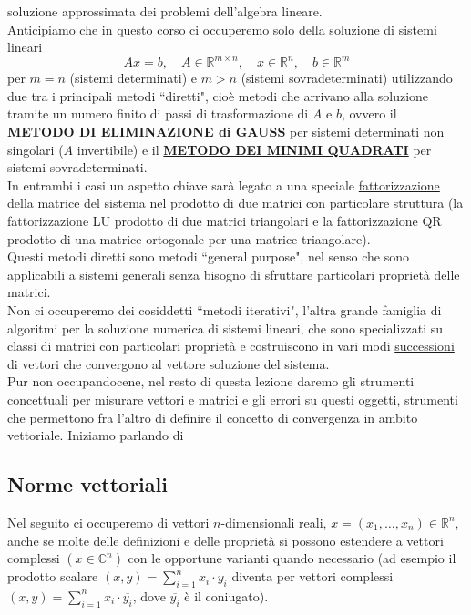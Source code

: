 \documentclass[12pt,a4paper]{article}
\begin{document}
soluzione approssimata dei problemi dell'algebra lineare.\\
Anticipiamo che in questo corso ci occuperemo solo della soluzione di sistemi lineari
\begin{equation*}
    Ax=b,\quad A\in\mathbb{R}^{m\times n}, \quad x\in\mathbb{R}^n,\quad b\in\mathbb{R}^m
\end{equation*}
per $m=n$ (sistemi determinati) e $m>n$ (sistemi sovradeterminati) utilizzando due tra i principali metodi ``diretti", cioè metodi che arrivano alla soluzione tramite un numero finito di passi di trasformazione di $A$ e $b$, ovvero il \uline{\textbf{METODO DI ELIMINAZIONE di GAUSS}} per sistemi determinati
non singolari ($A$ invertibile) e il \uline{\textbf{METODO DEI MINIMI QUADRATI}} per sistemi sovradeterminati.\\In entrambi i casi un aspetto chiave sarà legato a una speciale \uline{fattorizzazione} della matrice del sistema nel prodotto di due matrici con particolare struttura (la fattorizzazione LU prodotto di due matrici triangolari e la fattorizzazione QR prodotto di una matrice ortogonale per una matrice triangolare).\\Questi metodi diretti sono metodi
``general purpose", nel senso che sono applicabili a sistemi generali senza bisogno di sfruttare particolari proprietà delle matrici.\\Non ci occuperemo dei cosiddetti ``metodi iterativi", l'altra grande famiglia di algoritmi per la soluzione numerica di sistemi lineari, che sono specializzati su classi di matrici con particolari proprietà e costruiscono in vari modi \uline{successioni} di vettori che convergono al vettore soluzione del sistema.\\Pur non occupandocene, nel
resto di questa lezione daremo gli strumenti concettuali per misurare vettori e matrici e gli errori su questi oggetti, strumenti che permettono fra l'altro di definire il concetto di convergenza in ambito vettoriale. Iniziamo parlando di

\subsection{Norme vettoriali}
Nel seguito ci occuperemo di vettori $n$-dimensionali reali, $x = (x_1, \dotso, x_n) \in \mathbb{R}^n$, anche se molte delle definizioni e delle proprietà si possono estendere
a vettori complessi $(x \in \mathbb{C}^n)$ con le opportune varianti quando necessario (ad esempio il prodotto scalare $(x,y) = \sum\limits_{i=1}^n x_i \cdot y_i$ diventa per vettori complessi $(x,y) = \sum\limits_{i=1}^n x_i \cdot \overline{y_i}$, dove $\overline{y_i}$ è il coniugato).
\end{document}
